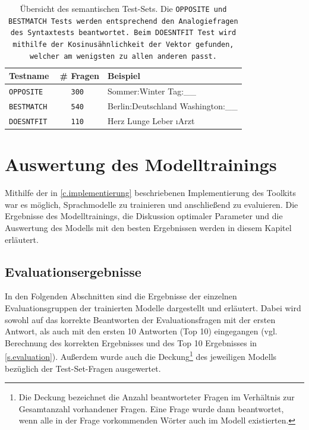 \begin{table}[!ht]\vspace{1ex}\small\centering{}\begin{tabular}{|l|c|l|}
\hline Testname & \# Fragen & Beispiel \\ \hline\hline
\tt{OPPOSITE}  & \tt{300} & Sommer:Winter Tag:\_\_ \\ \hline
\tt{BESTMATCH} & \tt{540} & Berlin:Deutschland Washington:\_\_ \\ \hline
\tt{DOESNTFIT} & \tt{110} & Herz Lunge Leber \i{Arzt} \\ \hline
\end{tabular}
\caption[Übersicht des semantischen Test-Sets]{\label{tab.semantictestset}Übersicht des semantischen Test-Sets. Die \tt{OPPOSITE} und \tt{BESTMATCH} Tests werden entsprechend den Analogiefragen des Syntaxtests beantwortet. Beim \tt{DOESNTFIT} Test wird mithilfe der Kosinusähnlichkeit der Vektor gefunden, welcher am wenigsten zu allen anderen passt.}
\vspace{1ex}\end{table}

\chapter{Auswertung des Modelltrainings}\label{c.auswertung}

Mithilfe der in \autoref{c.implementierung} beschriebenen Implementierung des Toolkits war es möglich, Sprachmodelle zu trainieren und anschließend zu evaluieren. Die Ergebnisse des Modelltrainings, die Diskussion optimaler Parameter und die Auswertung des Modells mit den besten Ergebnissen werden in diesem Kapitel erläutert.


\section{Evaluationsergebnisse}\label{s.testergebnis}
In den Folgenden Abschnitten sind die Ergebnisse der einzelnen Evaluationsgruppen der trainierten Modelle dargestellt und erläutert. Dabei wird sowohl auf das korrekte Beantworten der Evaluationsfragen mit der ersten Antwort, als auch mit den ersten 10 Antworten (Top 10) eingegangen (vgl. Berechnung des korrekten Ergebnisses und des Top 10 Ergebnisses in \autoref{s.evaluation}). Außerdem wurde auch die Deckung\footnote{Die Deckung bezeichnet die Anzahl beantworteter Fragen im Verhältnis zur Gesamtanzahl vorhandener Fragen. Eine Frage wurde dann beantwortet, wenn alle in der Frage vorkommenden Wörter auch im Modell existierten.} des jeweiligen Modells bezüglich der Test-Set-Fragen ausgewertet.

